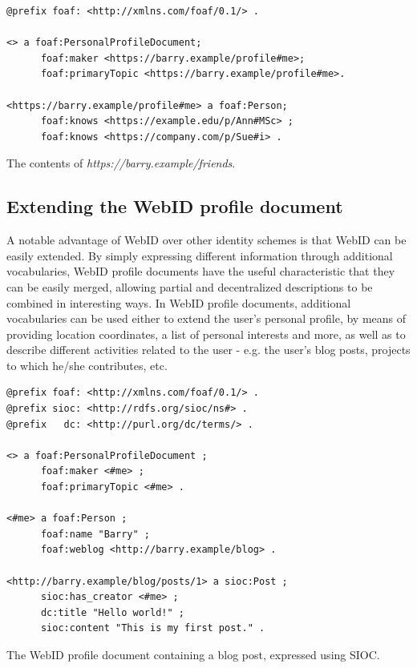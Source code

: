 \begin{example}
\begin{verbatim}
@prefix foaf: <http://xmlns.com/foaf/0.1/> .

<> a foaf:PersonalProfileDocument;
      foaf:maker <https://barry.example/profile#me>;
      foaf:primaryTopic <https://barry.example/profile#me>.

<https://barry.example/profile#me> a foaf:Person;
      foaf:knows <https://example.edu/p/Ann#MSc> ;
      foaf:knows <https://company.com/p/Sue#i> .
\end{verbatim}
\caption{The contents of \textit{https://barry.example/friends}.}
\label{ex:webid_profile_friends}
\end{example}


\subsection{Extending the WebID profile document}
\label{subsec:extending_webid}
A notable advantage of WebID over other identity schemes is that WebID can be easily extended. By simply expressing different information through additional vocabularies, WebID profile documents have the useful characteristic that they can be easily merged, allowing partial and decentralized descriptions to be combined in interesting ways. In WebID profile documents, additional vocabularies can be used either to extend the user's personal profile, by means of providing location coordinates, a list of personal interests and more, as well as to describe different activities related to the user - e.g. the user's blog posts, projects to which he/she contributes, etc.

\begin{example}[htbp]
\begin{verbatim}
@prefix foaf: <http://xmlns.com/foaf/0.1/> .
@prefix sioc: <http://rdfs.org/sioc/ns#> .
@prefix   dc: <http://purl.org/dc/terms/> .

<> a foaf:PersonalProfileDocument ;
      foaf:maker <#me> ;
      foaf:primaryTopic <#me> .

<#me> a foaf:Person ; 
      foaf:name "Barry" ;
      foaf:weblog <http://barry.example/blog> .

<http://barry.example/blog/posts/1> a sioc:Post ;
      sioc:has_creator <#me> ;
      dc:title "Hello world!" ;
      sioc:content "This is my first post." .
\end{verbatim}
\caption{The WebID profile document containing a blog post, expressed using SIOC.}
\label{ex:webid_sioc}
\end{example}

